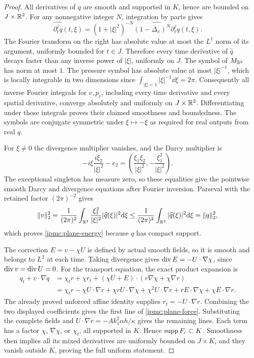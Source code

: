 \begin{proof}
All derivatives of $q$ are smooth and supported in $K$, hence are bounded
on $J\times\mathbb R^2$. For any nonnegative integer $N$, integration by parts gives
\[
\widehat{\partial_t^j q}(t,\xi)
=(1+|\xi|^2)^{-N}\widehat{(1-\Delta_x)^N\partial_t^j q}(t,\xi).
\]
The Fourier transform on the right has absolute value at most the $L^1$
norm of its argument, uniformly bounded for $t\in J$. Therefore every
time derivative of $\widehat q$ decays faster than any inverse power of
$|\xi|$, uniformly on $J$. The symbol of $M_{\mathbb R^2}$ has norm at most $1$.
The pressure symbol has absolute value at most $|\xi|^{-1}$, which is
locally integrable in two dimensions since
$\int_{|\xi|<1}|\xi|^{-1}\dd\xi=2\pi$.
Consequently all inverse Fourier integrals for $v,p_c$, including every
time derivative and every spatial derivative, converge absolutely and
uniformly on $J\times\mathbb R^2$. Differentiating under those integrals proves
their claimed smoothness and boundedness. The symbols are conjugate symmetric
under $\xi\mapsto-\xi$ as required for real outputs from real $q$.

For $\xi\ne0$ the divergence multiplier vanishes, and the Darcy multiplier is
\[
-i\xi\frac{i\xi_2}{|\xi|^2}-e_2
=\left(\frac{\xi_1\xi_2}{|\xi|^2},-\frac{\xi_1^2}{|\xi|^2}\right).
\]
The exceptional singleton has measure zero, so these equalities give the
pointwise smooth Darcy and divergence equations after Fourier inversion.
Parseval with the retained factor $(2\pi)^{-2}$ gives
\[
\|v\|_2^2=\frac1{(2\pi)^2}\int_{\mathbb R^2}
\frac{\xi_1^2}{|\xi|^2}|\widehat q(\xi)|^2\mathrm d\xi
\le\frac1{(2\pi)^2}\int_{\mathbb R^2}|\widehat q(\xi)|^2\mathrm d\xi=\|q\|_2^2,
\]
which proves \eqref{ipmc:plane-energy} because $q$ has compact support.

The correction $E=v-\chi U$ is defined by actual smooth fields, so it is
smooth and belongs to $L^2$ at each time. Taking divergence gives
$\operatorname{div} E=-U\cdot\nabla\chi$, since $\operatorname{div} v=\operatorname{div} U=0$.
For the transport equation, the exact product expansion is
\begin{align*}
q_t+v\cdot\nabla q
&=\chi_t r+\chi r_t+(\chi U+E)\cdot(r\nabla\chi+\chi\nabla r)\\
&=\chi_t r-\chi U\cdot\nabla r+\chi rU\cdot\nabla\chi
+\chi^2U\cdot\nabla r+rE\cdot\nabla\chi+\chi E\cdot\nabla r.
\end{align*}
The already proved unforced affine identity supplies $r_t=-U\cdot\nabla r$.
Combining the two displayed coefficients gives the first line of
\eqref{ipmc:plane-force}. Substituting the complete fields and
$U\cdot\nabla r=-Ak_1^2\alpha h/\kappa$ gives the remaining lines.
Each term has a factor $\chi$, $\nabla\chi$, or $\chi_t$, all supported
in $K$. Hence $\operatorname{supp} F_c\subset K$. Smoothness then implies all its mixed
derivatives are uniformly bounded on $J\times K$, and they vanish outside
$K$, proving the full uniform statement.
\end{proof}

